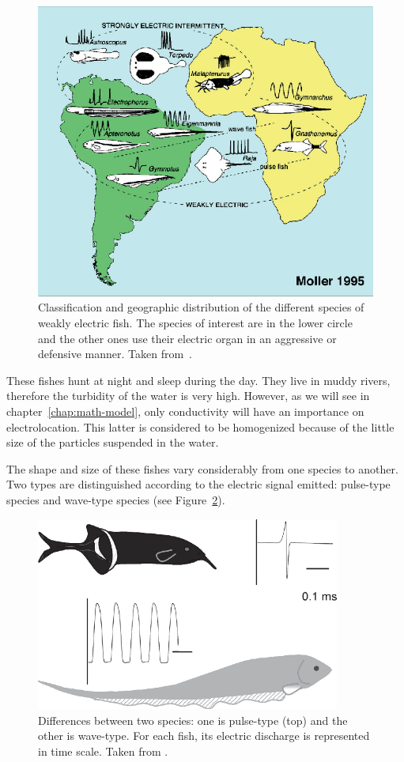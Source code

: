 \begin{figure}[!h]
\centering
\includegraphics[width=12cm]{intro/figures/fish_geography.eps}
\caption{Classification and geographic distribution of the different species of weakly electric fish. The species of interest are in the lower circle and the other ones use their electric organ in an aggressive or defensive manner. Taken from~\cite{moller1995electric}. \label{fig:geography}}
\end{figure}

These fishes hunt at night and sleep during the day. They live in muddy rivers,
therefore the turbidity of the water is very high. However, as we will see in
chapter~\ref{chap:math-model}, only conductivity will have an importance on electrolocation.
This latter is considered to be homogenized because of the little size of the particles
suspended in the water.

The shape and size of these fishes vary considerably from one species to
another. Two types are distinguished according to the electric signal
emitted: pulse-type species and wave-type species (see Figure~\ref{fig:pulse_wave}).

\begin{figure}[!h]
\centering
\includegraphics[width=10cm]{intro/figures/pulse_wave}
\caption{Differences between two species: one is pulse-type (top) and the other is wave-type. For each fish, its electric discharge is represented in time scale. Taken from \cite{graff2004fish}. \label{fig:pulse_wave}}
\end{figure}


